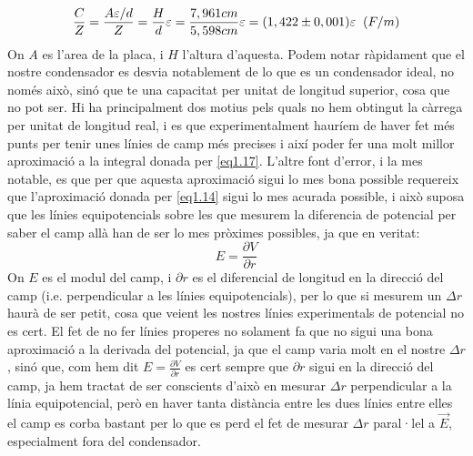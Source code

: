 \documentclass[a4paper,10.5pt]{report}
\begin{document}
\begin{equation}
	\frac{C}{Z} = \frac{A\varepsilon/d}{Z} = \frac{H}{d}\varepsilon = \frac{7,961cm}{5,598cm}\varepsilon = (1,422 \pm 0,001)\varepsilon \hspace{0,2cm} (F/m)
\end{equation}
On $A$ es l'area de la placa, i $H$ l'altura d'aquesta.
Podem notar ràpidament que el nostre condensador es desvia notablement de lo que es un condensador ideal, no només això, sinó que te una capacitat per unitat de longitud superior, cosa que no pot ser. Hi ha principalment dos motius pels quals no hem obtingut la càrrega per unitat de longitud real, i es que experimentalment hauríem de haver fet més punts per tenir unes línies de camp més precises i així poder fer una molt millor aproximació a la integral donada per \eqref{eq1.17}. L'altre font d'error, i la mes notable, es que per que aquesta aproximació sigui lo mes bona possible requereix que l'aproximació donada per \eqref{eq1.14} sigui lo mes acurada possible, i això suposa que les línies equipotencials sobre les que mesurem la diferencia de potencial per saber el camp allà han de ser lo mes pròximes possibles, ja que en veritat:
\begin{equation}
	E = \frac{\partial V}{\partial r}
\end{equation}
On $E$ es el modul del camp, i $\partial r$ es el diferencial de longitud en la direcció del camp (i.e. perpendicular a les línies equipotencials), per lo que si mesurem un  $\Delta r$ haurà de ser petit, cosa que veient les nostres línies experimentals de potencial no es cert. El fet de no fer línies properes no solament fa que no sigui una bona aproximació a la derivada del potencial, ja que el camp varia molt en el nostre $\Delta r$, sinó que, com hem dit $E = \frac{\partial V}{\partial r}$ es cert sempre que $\partial r$ sigui en la direcció del camp, ja hem tractat de ser conscients d'això en mesurar $\Delta r$ perpendicular a la línia equipotencial, però en haver tanta distància entre les dues línies entre elles el camp es corba bastant per lo que es perd el fet de mesurar $\Delta r$ paral·lel a $\vec{E}$, especialment fora del condensador. 
\end{document}
